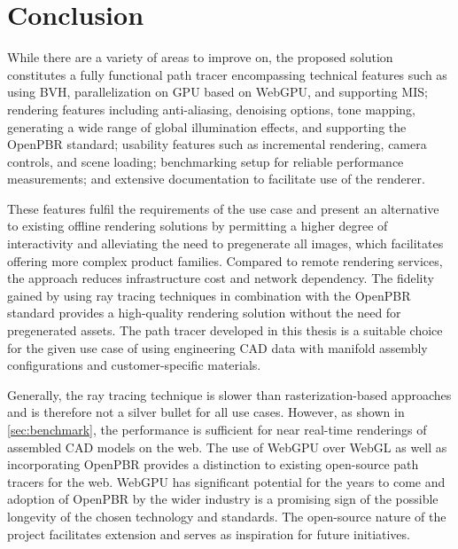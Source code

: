 \section{Conclusion}

While there are a variety of areas to improve on, the proposed solution constitutes a fully functional path tracer encompassing technical features such as using \gls{BVH}, parallelization on \gls{GPU} based on \gls{WebGPU}, and supporting \gls{MIS}; rendering features including anti-aliasing, denoising options, tone mapping, generating a wide range of global illumination effects, and supporting the \gls{OpenPBR} standard; usability features such as incremental rendering, camera controls, and scene loading; benchmarking setup for reliable performance measurements; and extensive documentation to facilitate use of the renderer.

These features fulfil the requirements of the use case and present an alternative to existing offline rendering solutions by permitting a higher degree of interactivity and alleviating the need to pregenerate all images, which facilitates offering more complex product families. Compared to remote rendering services, the approach reduces infrastructure cost and network dependency. The fidelity gained by using ray tracing techniques in combination with the \gls{OpenPBR} standard provides a high-quality rendering solution without the need for pregenerated assets. The path tracer developed in this thesis is a suitable choice for the given use case of using engineering \gls{CAD} data with manifold assembly configurations and customer-specific materials.

Generally, the ray tracing technique is slower than rasterization-based approaches and is therefore not a silver bullet for all use cases. However, as shown in \autoref{sec:benchmark}, the performance is sufficient for near real-time renderings of assembled \gls{CAD} models on the web. The use of \gls{WebGPU} over \gls{WebGL} as well as incorporating \gls{OpenPBR} provides a distinction to existing open-source path tracers for the web. \gls{WebGPU} has significant potential for the years to come and adoption of \gls{OpenPBR} by the wider industry is a promising sign of the possible longevity of the chosen technology and standards. The open-source nature of the project facilitates extension and serves as inspiration for future initiatives.
